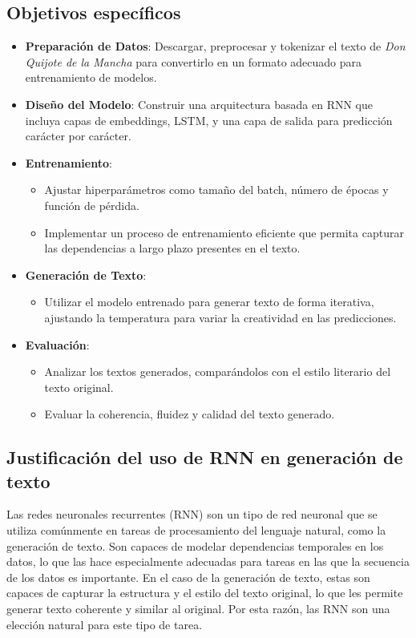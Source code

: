\documentclass{article}
\begin{document}
\subsection{Objetivos específicos}

\begin{itemize}
    \item \textbf{Preparación de Datos}: Descargar, preprocesar y tokenizar el texto de \emph{Don Quijote de la Mancha} para convertirlo en un formato adecuado para entrenamiento de modelos.
    \item \textbf{Diseño del Modelo}: Construir una arquitectura basada en RNN que incluya capas de embeddings, LSTM, y una capa de salida para predicción carácter por carácter.
    \item \textbf{Entrenamiento}:
    \begin{itemize}
        \item Ajustar hiperparámetros como tamaño del batch, número de épocas y función de pérdida.
        \item Implementar un proceso de entrenamiento eficiente que permita capturar las dependencias a largo plazo presentes en el texto.
    \end{itemize}
    \item \textbf{Generación de Texto}:
    \begin{itemize}
        \item Utilizar el modelo entrenado para generar texto de forma iterativa, ajustando la temperatura para variar la creatividad en las predicciones.
    \end{itemize}
    \item \textbf{Evaluación}:
    \begin{itemize}
        \item Analizar los textos generados, comparándolos con el estilo literario del texto original.
        \item Evaluar la coherencia, fluidez y calidad del texto generado.
    \end{itemize}
\end{itemize}

\subsection{Justificación del uso de RNN en generación de texto}
Las redes neuronales recurrentes (RNN) son un tipo de red neuronal que se utiliza comúnmente en tareas de procesamiento del lenguaje natural, como la generación de texto. Son capaces de modelar dependencias temporales en los datos, lo que las hace especialmente adecuadas para tareas en las que la secuencia de los datos es importante.
En el caso de la generación de texto, estas son capaces de capturar la estructura y el estilo del texto original, lo que les permite generar texto coherente y similar al original. Por esta razón, las RNN son una elección natural para este tipo de tarea.
\end{document}
